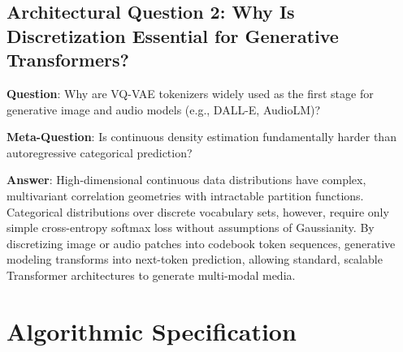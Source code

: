 \documentclass[11pt,a4paper]{article}
\theoremstyle{definition}
\begin{document}
\subsection{Architectural Question 2: Why Is Discretization Essential for Generative Transformers?}
\textbf{Question}: Why are VQ-VAE tokenizers widely used as the first stage for generative image and audio models (e.g., DALL-E, AudioLM)?

\textbf{Meta-Question}: Is continuous density estimation fundamentally harder than autoregressive categorical prediction?

\textbf{Answer}: High-dimensional continuous data distributions have complex, multivariant correlation geometries with intractable partition functions. Categorical distributions over discrete vocabulary sets, however, require only simple cross-entropy softmax loss without assumptions of Gaussianity. By discretizing image or audio patches into codebook token sequences, generative modeling transforms into next-token prediction, allowing standard, scalable Transformer architectures to generate multi-modal media.

\section{Algorithmic Specification}
\end{document}
